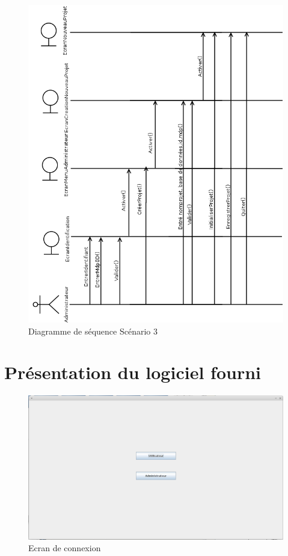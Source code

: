 \documentclass[12pt]{report}
\begin{document}
\begin{figure}[h!]
\begin{center}
\includegraphics[scale=0.34]{DiagSeq3.png}
\caption{Diagramme de séquence Scénario 3}
\end{center}
\end{figure}


\chapter{Présentation du logiciel fourni}

\begin{figure}
\centering
\includegraphics[scale=0.3]{IHM/accueil.png}
\caption{Ecran de connexion}
\end{figure}
\end{document}
